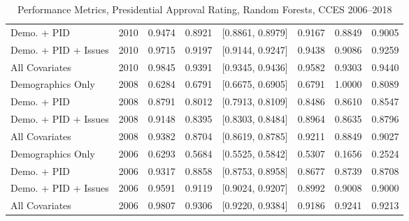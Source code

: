 \begin{table}[H]
\begin{tabular}{lrrrlrrr}
  Demo. + PID & 2010 & 0.9474 & 0.8921 & [0.8861, 0.8979] & 0.9167 & 0.8849 & 0.9005 \\ 
  Demo. + PID + Issues & 2010 & 0.9715 & 0.9197 & [0.9144, 0.9247] & 0.9438 & 0.9086 & 0.9259 \\ 
  All Covariates & 2010 & 0.9845 & 0.9391 & [0.9345, 0.9436] & 0.9582 & 0.9303 & 0.9440 \\ 
  Demographics Only & 2008 & 0.6284 & 0.6791 & [0.6675, 0.6905] & 0.6791 & 1.0000 & 0.8089 \\ 
  Demo. + PID & 2008 & 0.8791 & 0.8012 & [0.7913, 0.8109] & 0.8486 & 0.8610 & 0.8547 \\ 
  Demo. + PID + Issues & 2008 & 0.9148 & 0.8395 & [0.8303, 0.8484] & 0.8964 & 0.8635 & 0.8796 \\ 
  All Covariates & 2008 & 0.9382 & 0.8704 & [0.8619, 0.8785] & 0.9211 & 0.8849 & 0.9027 \\ 
  Demographics Only & 2006 & 0.6293 & 0.5684 & [0.5525, 0.5842] & 0.5307 & 0.1656 & 0.2524 \\ 
  Demo. + PID & 2006 & 0.9317 & 0.8858 & [0.8753, 0.8958] & 0.8677 & 0.8739 & 0.8708 \\ 
  Demo. + PID + Issues & 2006 & 0.9591 & 0.9119 & [0.9024, 0.9207] & 0.8992 & 0.9008 & 0.9000 \\ 
  All Covariates & 2006 & 0.9807 & 0.9306 & [0.9220, 0.9384] & 0.9186 & 0.9241 & 0.9213 \\ 
   \bottomrule
\end{tabular}
\caption{Performance Metrics, Presidential Approval Rating, Random Forests, CCES 2006--2018} 
\label{tab:cces_presapprov_rf}
\end{table}
